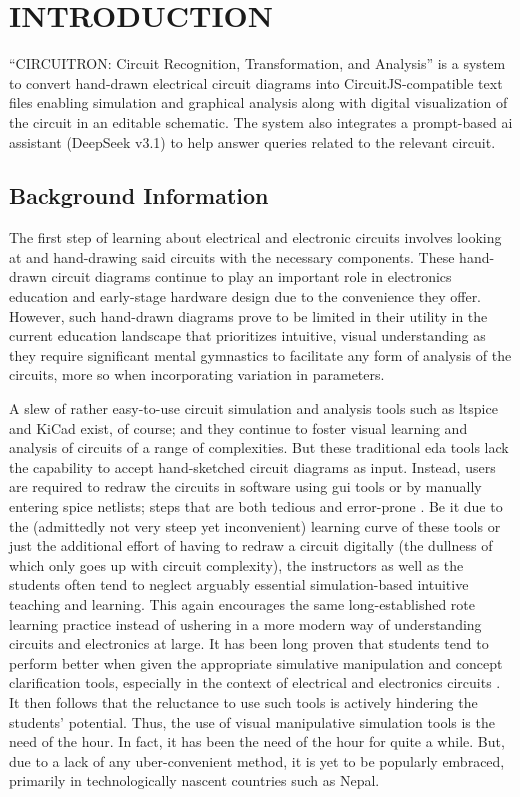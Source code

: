 \chapter{INTRODUCTION}

\noindent ``CIRCUITRON: Circuit Recognition, Transformation, and Analysis'' is a system to convert hand-drawn electrical circuit diagrams into CircuitJS-compatible text files enabling simulation and graphical analysis along with digital visualization of the circuit in an editable schematic. The system also integrates a prompt-based \gls{ai} assistant (DeepSeek v3.1) to help answer queries related to the relevant circuit.

\section{Background Information}

The first step of learning about electrical and electronic circuits involves looking at and hand-drawing said circuits with the necessary components. These hand-drawn circuit diagrams continue to play an important role in electronics education and early-stage hardware design due to the convenience they offer. However, such hand-drawn diagrams prove to be limited in their utility in the current education landscape that prioritizes intuitive, visual understanding as they require significant mental gymnastics to facilitate any form of analysis of the circuits, more so when incorporating variation in parameters.

A slew of rather easy-to-use circuit simulation and analysis tools such as \gls{ltspice} and KiCad exist, of course; and they continue to foster visual learning and analysis of circuits of a range of complexities. But these traditional \gls{eda} tools lack the capability to accept hand-sketched circuit diagrams as input. Instead, users are required to redraw the circuits in software using \gls{gui} tools or by manually entering \gls{spice} netlists; steps that are both tedious and error-prone \cite{reddy2021handdrawn, sertdemir2022img2sim}. Be it due to the (admittedly not very steep yet inconvenient) learning curve of these tools or just the additional effort of having to redraw a circuit digitally (the dullness of which only goes up with circuit complexity), the instructors as well as the students often tend to neglect arguably essential simulation-based intuitive teaching and learning. This again encourages the same long-established rote learning practice instead of ushering in a more modern way of understanding circuits and electronics at large. It has been long proven that students tend to perform better when given the appropriate simulative manipulation and concept clarification tools, especially in the context of electrical and electronics circuits \cite{chen2011efficacy}. It then follows that the reluctance to use such tools is actively hindering the students' potential. Thus, the use of visual manipulative simulation tools is the need of the hour. In fact, it has been the need of the hour for quite a while. But, due to a lack of any uber-convenient method, it is yet to be popularly embraced, primarily in technologically nascent countries such as Nepal.

